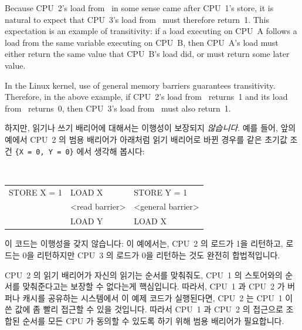 \begin{enumerate}
Because CPU~2's load from~ in some sense came after CPU~1's store, it
is natural to expect that CPU~3's load from~ must therefore return~1.
This expectation is an example of transitivity: if a load executing on
CPU~A follows a load from the same variable executing on CPU~B, then
CPU~A's load must either return the same value that CPU~B's load did,
or must return some later value.

In the Linux kernel, use of general memory barriers guarantees
transitivity.  Therefore, in the above example, if CPU~2's load from~
returns~1 and its load from~ returns~0, then CPU~3's load from~ must
also return~1.
\fi

하지만, 읽기나 쓰기 배리어에 대해서는 이행성이 보장되지 {\em 않습니다}.
예를 들어, 앞의 예에서 CPU~2 의 범용 배리어가 아래처럼 읽기 배리어로 바뀐
경우를 같은 초기값 조건 {\tt \{X~=~0, Y~=~0\}} 에서 생각해 봅시다:

\vspace{5pt}
\begin{minipage}[t]{\columnwidth}
\tt
\scriptsize
\begin{tabular}{l|l|l}
	\nf{CPU 1}	& \nf{CPU 2}		& \nf{CPU 3} \\
	\hline
	STORE X = 1	& LOAD X		& STORE Y = 1 \\
			& <read barrier>	& <general barrier> \\
			& LOAD Y		& LOAD X \\
\end{tabular}
\end{minipage}
\vspace{5pt}

이 코드는 이행성을 갖지 않습니다: 이 예에서는, CPU~2 의  로드가 1을
리턴하고,  로드는 0을 리턴하지만 CPU~3 의  로드가 0을 리턴하는 것도
완전히 합법적입니다.

CPU~2 의 읽기 배리어가 자신의 읽기는 순서를 맞춰줘도, CPU~1 의 스토어와의
순서를 맞춰준다고는 보장할 수 없다는게 핵심입니다.  따라서, CPU~1 과 CPU~2 가
버퍼나 캐시를 공유하는 시스템에서 이 예제 코드가 실행된다면, CPU~2 는 CPU~1 이
쓴 값에 좀 빨리 접근할 수 있을 것입니다.  따라서 CPU~1 과 CPU~2 의 접근으로
조합된 순서를 모든 CPU 가 동의할 수 있도록 하기 위해 범용 배리어가 필요합니다.


\end{enumerate}
